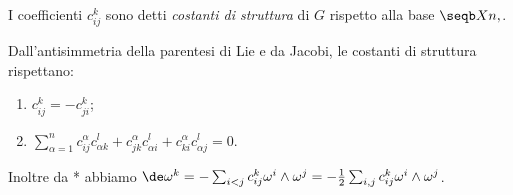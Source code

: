 \begin{definition}
	I coefficienti $c_{ij}^k$ sono detti \emph{costanti di struttura} di $G$ rispetto alla base $\seqb Xn,$.
\end{definition}

Dall'antisimmetria della parentesi di Lie e da Jacobi, le costanti di struttura rispettano:
\begin{enumerate}
	\item $c_{ij}^k = -c_{ji}^k$;
	\item $\sum_{\alpha=1}^n c_{ij}^\alpha c_{\alpha k}^l + c_{jk}^\alpha c_{\alpha i}^l + c_{ki}^\alpha c_{\alpha j}^l = 0$.
\end{enumerate}

Inoltre da * abbiamo $\de \omega^k = -\sum_{i<j} c_{ij}^k \omega^i \wedge \omega^j = -\frac 12 \sum_{i,j} c_{ij}^k \omega^i \wedge \omega^j$.


